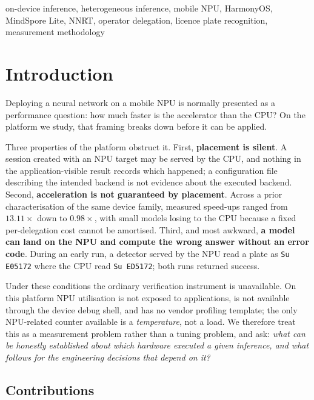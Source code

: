 \documentclass[conference]{IEEEtran}
\begin{document}
\begin{IEEEkeywords}
on-device inference, heterogeneous inference, mobile NPU, HarmonyOS, MindSpore
Lite, NNRT, operator delegation, licence plate recognition, measurement
methodology
\end{IEEEkeywords}

\section{Introduction}

Deploying a neural network on a mobile NPU is normally presented as a
performance question: how much faster is the accelerator than the CPU? On the
platform we study, that framing breaks down before it can be applied.

Three properties of the platform obstruct it. First, \textbf{placement is
silent}. A session created with an NPU target may be served by the CPU, and
nothing in the application-visible result records which happened; a
configuration file describing the intended backend is not evidence about the
executed backend. Second, \textbf{acceleration is not guaranteed by placement}.
Across a prior characterisation of the same device family, measured speed-ups
ranged from $13.11\times$ down to $0.98\times$, with small models losing to the
CPU because a fixed per-delegation cost cannot be amortised. Third, and most
awkward, \textbf{a model can land on the NPU and compute the wrong answer
without an error code}. During an early run, a detector served by the NPU read
a plate as \texttt{Su\,E05172} where the CPU read \texttt{Su\,ED5172}; both runs
returned success.

Under these conditions the ordinary verification instrument is unavailable. On
this platform NPU utilisation is not exposed to applications, is not available
through the device debug shell, and has no vendor profiling template; the only
NPU-related counter available is a \emph{temperature}, not a load. We therefore
treat this as a measurement problem rather than a tuning problem, and ask:
\emph{what can be honestly established about which hardware executed a given
inference, and what follows for the engineering decisions that depend on it?}

\subsection{Contributions}
\end{document}
